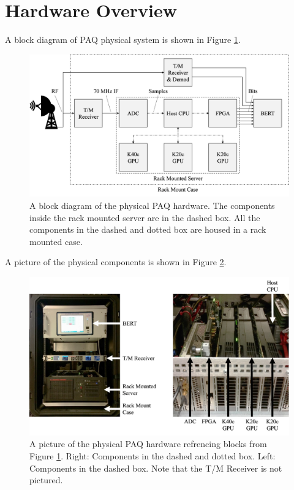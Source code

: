\section{Hardware Overview}
\label{sec:hardware}
A block diagram of PAQ physical system is shown in Figure \ref{fig:hardwareblock}.
\begin{figure}
	\centering\includegraphics[width=11.58in/100*55]{figures/systemOverview/hardwareblock.pdf}
	\caption{A block diagram of the physical PAQ hardware. The components inside the rack mounted server are in the dashed box. All the components in the dashed and dotted box are housed in a rack mounted case.}
	\label{fig:hardwareblock}
\end{figure}
A picture of the physical components is shown in Figure \ref{fig:HostSystem}.
\begin{figure}
	\centering\includegraphics[scale=0.55]{figures/systemOverview/HostSystem.jpg}
	\caption{A picture of the physical PAQ hardware refrencing blocks from Figure \ref{fig:hardwareblock}. Right: Components in the dashed and dotted box. Left: Components in the dashed box. Note that the T/M Receiver is not pictured.}
	\label{fig:HostSystem}
\end{figure}
